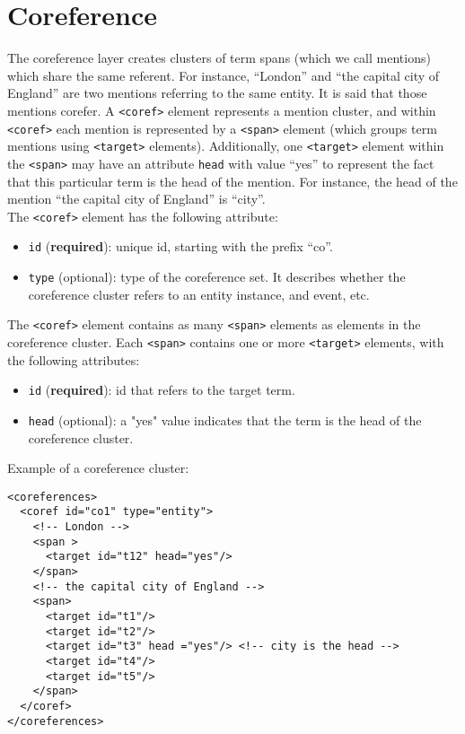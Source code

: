 
\section{Coreference}
\label{sec:coreference}

The coreference layer creates clusters of term spans (which we call
mentions) which share the same referent. For instance, ``London'' and ``the
capital city of England'' are two mentions referring to the same entity. It
is said that those mentions corefer.  A \texttt{<coref>} element represents
a mention cluster, and within \texttt{<coref>} each mention is represented
by a \texttt{<span>} element (which groups term mentions using
\texttt{<target>} elements). Additionally, one \texttt{<target>} element
within the \texttt{<span>} may have an attribute \texttt{head} with value
``yes'' to represent the fact that this particular term is the head of the
mention. For instance, the head of the mention ``the capital city of
England'' is ``city''.\\

The \texttt{<coref>} element has the following attribute:
\begin{itemize}
\item \texttt{id} (\textbf{required}): unique id, starting with the prefix ``co''.
\item \texttt{type} (optional): type of the coreference set. It describes
  whether the coreference cluster refers to an entity instance, and event,
  etc.
\end{itemize}

The \texttt{<coref>} element contains as many \texttt{<span>} elements as
elements in the coreference cluster. Each \texttt{<span>} contains one or
more \texttt{<target>} elements, with the following attributes:
\begin{itemize}
\item \texttt{id} (\textbf{required}): id that refers to the target term.
\item \texttt{head} (optional): a "yes" value indicates that the term is the
  head of the coreference cluster.
\end{itemize}

Example of a coreference cluster:

\begin{Verbatim}[fontsize=\small]
<coreferences>
  <coref id="co1" type="entity">
    <!-- London -->
    <span >
      <target id="t12" head="yes"/>
    </span>
    <!-- the capital city of England -->
    <span>
      <target id="t1"/>
      <target id="t2"/>
      <target id="t3" head ="yes"/> <!-- city is the head -->
      <target id="t4"/>
      <target id="t5"/>
    </span>
  </coref>
</coreferences>
\end{Verbatim}


